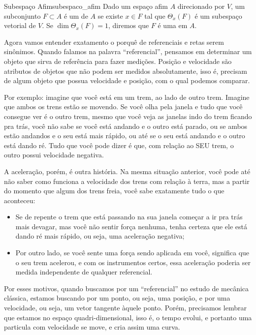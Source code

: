 \documentclass[a4paper,12pt]{book}
\begin{document}
\begin{defi}{Subespaço Afim}{subespaco_afim}
  Dado um espaço afim $A$ direcionado por $V$, um subconjunto $F \subset A$ é um  de $A$ se existe $x \in F$ tal que $\Theta_x(F)$ é um subespaço vetorial de $V$. Se $\dim \Theta_x(F) = 1$, diremos que $F$ é uma  em $A$.
\end{defi}

Agora vamos entender exatamento o porquê de referenciais e retas serem sinônimos. Quando falamos na palavra ``referencial'', pensamos em determinar um objeto que sirva de referência para fazer medições. Posição e velocidade são atributos de objetos que não podem ser medidos absolutamente, isso é, precisam de algum objeto que possua velocidade e posição, com o qual podemos comparar.

Por exemplo: imagine que você está em um trem, ao lado de outro trem. Imagine que ambos os trens estão se movendo. Se você olha pela janela e tudo que você consegue ver é o outro trem, mesmo que você veja as janelas indo do trem ficando pra trás, você não sabe se você está andando e o outro está parado, ou se ambos estão andandos e o seu está mais rápido, ou até se o seu está andando e o outro está dando ré. Tudo que você pode dizer é que, com relação ao SEU trem, o outro possui velocidade negativa.

A aceleração, porém, é outra história. Na mesma situação anterior, você pode até não saber como funciona a velocidade dos trens com relação à terra, mas a partir do momento que algum dos trens freia, você sabe exatamente tudo o que aconteceu: \begin{itemize}
  \item Se de repente o trem que está passando na sua janela começar a ir pra trás mais devagar, mas você não sentir força nenhuma, tenha certeza que ele está dando ré mais rápido, ou seja, uma aceleração negativa;
  \item Por outro lado, se você sente uma força sendo aplicada em você, significa que o seu trem acelerou, e com os instrumentos certos, essa aceleração poderia ser medida independente de qualquer referencial.
\end{itemize}

Por esses motivos, quando buscamos por um ``referencial'' no estudo de mecânica clássica, estamos buscando por um ponto, ou seja, uma posição, e por uma velocidade, ou seja, um vetor tangente àquele ponto. Porém, precisamos lembrar que estamos no espaço quadri-dimensional, isso é, o tempo evolui, e portanto uma particula com velocidade se move, e cria assim uma curva.
\end{document}

